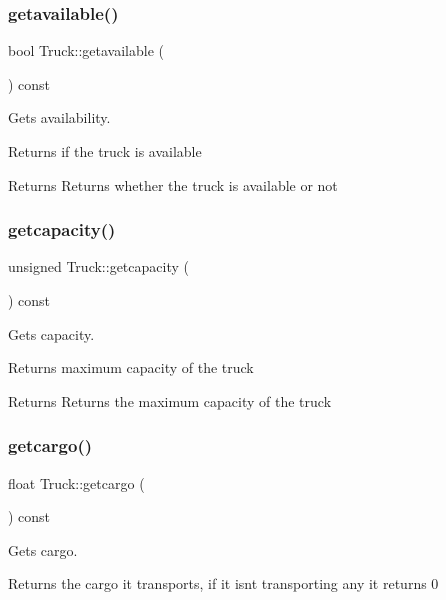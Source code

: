 \subsubsection{\texorpdfstring{getavailable()}{getavailable()}}
{\footnotesize\ttfamily bool Truck\+::getavailable (\begin{DoxyParamCaption}{ }\end{DoxyParamCaption}) const}



Gets availability. 

Returns if the truck is available

\begin{DoxyReturn}{Returns}
Returns whether the truck is available or not 
\end{DoxyReturn}
\mbox{\label{class_truck_ab8c3a335924da7d2c36c4c5ba4510db0}} 
\subsubsection{\texorpdfstring{getcapacity()}{getcapacity()}}
{\footnotesize\ttfamily unsigned Truck\+::getcapacity (\begin{DoxyParamCaption}{ }\end{DoxyParamCaption}) const}



Gets capacity. 

Returns maximum capacity of the truck

\begin{DoxyReturn}{Returns}
Returns the maximum capacity of the truck 
\end{DoxyReturn}
\mbox{\label{class_truck_a3936315853876f84c85c4ffff194e1a5}} 
\subsubsection{\texorpdfstring{getcargo()}{getcargo()}}
{\footnotesize\ttfamily float Truck\+::getcargo (\begin{DoxyParamCaption}{ }\end{DoxyParamCaption}) const}



Gets cargo. 

Returns the cargo it transports, if it isnt transporting any it returns 0

